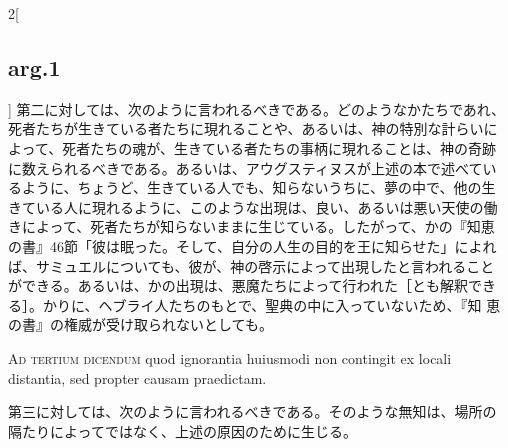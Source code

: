 \documentclass[paper=a4paper,fontsize=10pt,jafontsize=9pt,titlepage]{jlreq}
\begin{document}
\begin{paracol}{2}[\subsection{arg.1}]
第二に対しては、次のように言われるべきである。どのようなかたちであれ、
死者たちが生きている者たちに現れることや、あるいは、神の特別な計らいに
よって、死者たちの魂が、生きている者たちの事柄に現れることは、神の奇跡
に数えられるべきである。あるいは、アウグスティヌスが上述の本で述べてい
るように、ちょうど、生きている人でも、知らないうちに、夢の中で、他の生
きている人に現れるように、このような出現は、良い、あるいは悪い天使の働
きによって、死者たちが知らないままに生じている。したがって、かの『知恵
の書』46節「彼は眠った。そして、自分の人生の目的を王に知らせた」によれ
ば、サミュエルについても、彼が、神の啓示によって出現したと言われること
ができる。あるいは、かの出現は、悪魔たちによって行われた［とも解釈でき
る］。かりに、ヘブライ人たちのもとで、聖典の中に入っていないため、『知
恵の書』の権威が受け取られないとしても。

\switchcolumn*[\subsection{ad.3}]

{\scshape Ad tertium dicendum} quod ignorantia huiusmodi non contingit ex
locali distantia, sed propter causam praedictam.

\switchcolumn

第三に対しては、次のように言われるべきである。そのような無知は、場所の
隔たりによってではなく、上述の原因のために生じる。

\end{paracol}
\end{document}
